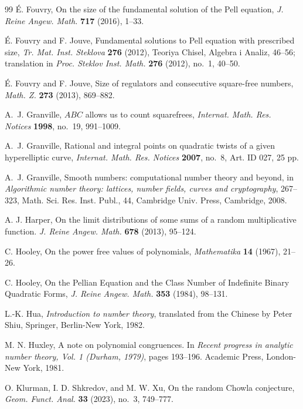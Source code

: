 \documentclass[reqno, 12pt]{amsart}
\theoremstyle{plain}
\theoremstyle{definition}
\theoremstyle{remark}
\begin{document}
\begin{thebibliography}{99}
 \'E. Fouvry,
On the size of the fundamental solution of the Pell equation, {\it 
J. Reine Angew. Math.} {\bf  717} (2016), 1--33.

 \'E. Fouvry and F. Jouve, Fundamental solutions to Pell equation with prescribed size,
{\it Tr. Mat. Inst. Steklova} {\bf 276} (2012), Teoriya Chisel, Algebra i Analiz, 46--56; translation in
{\it Proc. Steklov Inst. Math.} {\bf  276} (2012), no.~1, 40--50.

 \'E. Fouvry and F. Jouve, Size of regulators and consecutive square-free numbers, {\it Math. Z.} {\bf 273} (2013), 869--882. 

A.~J. Granville, $ABC$ allows us to count squarefrees, {\em Internat. Math. Res. Notices} {\bf 1998}, no.~19, 991--1009.

A.~J. Granville, Rational and integral points on quadratic twists of a given hyperelliptic curve, {\em Internat. Math. Res. Notices} {\bf 2007}, no.~8, Art. ID 027, 25 pp.

A.~J. Granville, Smooth numbers: computational number theory and beyond, in {\it Algorithmic number theory: lattices, number fields, curves and cryptography}, 267--323, Math. Sci. Res. Inst. Publ., 44, Cambridge Univ. Press, Cambridge, 2008.

A. J. Harper,
On the limit distributions of some sums of a random multiplicative function. {\it J. Reine Angew. Math.} {\bf 678} (2013), 95--124.

C. Hooley, On the power free values of polynomials, {\em Mathematika} {\bf 14} (1967), 21--26.

C. Hooley, On the Pellian Equation and the Class Number of Indefinite Binary Quadratic Forms, {\it J. Reine Angew. Math.} {\bf 353} (1984), 98--131.  

L.-K. Hua, {\it Introduction to number theory}, translated from the Chinese by Peter Shiu, 
Springer, Berlin-New York, 1982.

M. N. Huxley,
A note on polynomial congruences.
In \emph{Recent progress in analytic number theory,
Vol. 1 (Durham, 1979)}, pages 193--196.
Academic Press, London-New York, 1981.


 O. Klurman, I. D. Shkredov, and M. W.  Xu,
On the random Chowla conjecture,
{\it Geom. Funct. Anal.} {\bf  33} (2023), no.~3, 749--777.



\end{thebibliography}
\end{document}
